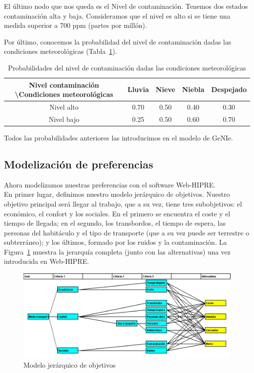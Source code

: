 \documentclass[12pt,a4paper,twoside,openright,titlepage,final]{article}
\begin{document}
El último nodo que nos queda es el Nivel de contaminación. Tenemos dos estados contaminación alta y baja. Consideramos que el nivel es alto si se tiene una medida superior a 700 ppm (partes por millón).

Por último, conocemos la probabilidad del nivel de contaminación dadas las condiciones meteorológicas (Tabla~\ref{tbl:condicionadas_3}).\\

\begin{table}[htbp!]
	\centering
	\caption{Probabilidades del nivel de contaminación dadas las condiciones meteorológicas}
	\label{tbl:condicionadas_3}
	\begin{tabular}{@{}ccccc@{}}
		\toprule
		Nivel contaminación \textbackslash Condiciones meteorológicas & Lluvia & Nieve & Niebla & Despejado \\ \midrule
		Nivel alto                                                    & 0.70   & 0.50   & 0.40   & 0.30       \\
		Nivel bajo                                                    & 0.25   & 0.50   & 0.60   & 0.70      \\ \bottomrule
	\end{tabular}
\end{table}

Todos las probabilidades anteriores las introducimos en el modelo de GeNIe.

\subsection{Modelización de preferencias}

Ahora modelizamos nuestras preferencias con el software Web-HIPRE.\\

En primer lugar, definimos nuestro modelo jerárquico de objetivos. Nuestro objetivo principal será llegar al trabajo, que a su vez, tiene tres subobjetivos: el económico, el confort y los sociales. En el primero se encuentra el coste y el tiempo de llegada; en el segundo, los transbordos, el tiempo de espera, las personas del habitáculo y el tipo de transporte (que a su vez puede ser terrestre o subterráneo); y los últimos, formado por los ruidos y la contaminación. La Figura~\ref{fig:modelo_jerarquico_objetivos} muestra la jerarquía completa (junto con las alternativas) una vez introducida en Web-HIPRE.

\begin{figure}[tbph!]
	\centering
	\includegraphics[width=0.9\linewidth]{imagenes/modelo_jerarquico_objetivos}
	\caption{Modelo jerárquico de objetivos}
	\label{fig:modelo_jerarquico_objetivos}
\end{figure}
\end{document}
